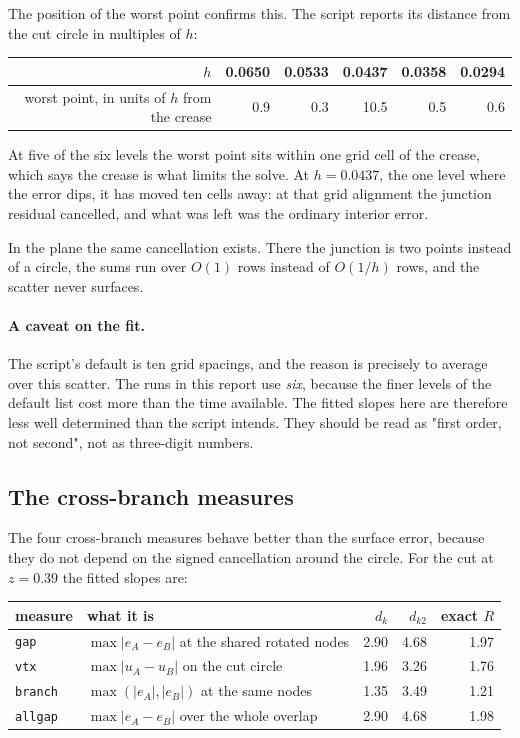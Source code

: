 The position of the worst point confirms this. The script reports its
distance from the cut circle in multiples of $h$:

\begin{center}
\small
\begin{tabular}{@{}rrrrrr@{}}
\toprule
$h$ & 0.0650 & 0.0533 & 0.0437 & 0.0358 & 0.0294 \\
\midrule
worst point, in units of $h$ from the crease
    & 0.9 & 0.3 & 10.5 & 0.5 & 0.6 \\
\bottomrule
\end{tabular}
\end{center}

At five of the six levels the worst point sits within one grid cell of
the crease, which says the crease is what limits the solve. At
$h=0.0437$, the one level where the error dips, it has moved ten cells
away: at that grid alignment the junction residual cancelled, and what
was left was the ordinary interior error.

In the plane the same cancellation exists. There the junction is two
points instead of a circle, the sums run over $O(1)$ rows instead of
$O(1/h)$ rows, and the scatter never surfaces.

\paragraph{A caveat on the fit.} The script's default is ten grid
spacings, and the reason is precisely to average over this scatter. The
runs in this report use \emph{six}, because the finer levels of the
default list cost more than the time available. The fitted slopes here
are therefore less well determined than the script intends. They should
be read as "first order, not second", not as three-digit numbers.

\subsection{The cross-branch measures}

The four cross-branch measures behave better than the surface error,
because they do not depend on the signed cancellation around the circle.
For the cut at $z=0.39$ the fitted slopes are:

\begin{center}
\small
\begin{tabular}{@{}llrrr@{}}
\toprule
measure & what it is & $d_k$ & $d_{k2}$ & exact $R$ \\
\midrule
\texttt{gap}    & $\max|e_A-e_B|$ at the shared rotated nodes & 2.90 & 4.68 & 1.97 \\
\texttt{vtx}    & $\max|u_A-u_B|$ on the cut circle           & 1.96 & 3.26 & 1.76 \\
\texttt{branch} & $\max(|e_A|,|e_B|)$ at the same nodes       & 1.35 & 3.49 & 1.21 \\
\texttt{allgap} & $\max|e_A-e_B|$ over the whole overlap      & 2.90 & 4.68 & 1.98 \\
\bottomrule
\end{tabular}
\end{center}

